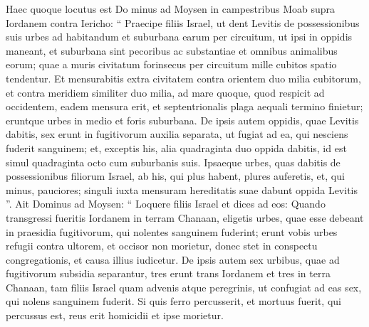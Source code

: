 \begin{biblechapter}
\begin{biblechapter}
\begin{biblechapter}
\begin{biblechapter}
\begin{biblechapter}
\begin{biblechapter}
\begin{biblechapter}
\begin{biblechapter}
\begin{biblechapter}
\begin{biblechapter}
\begin{biblechapter}
\begin{biblechapter}
\begin{biblechapter}
\begin{biblechapter}
\begin{biblechapter}
\begin{biblechapter}
\begin{biblechapter}
\begin{biblechapter}
\begin{biblechapter}
\begin{biblechapter}
\begin{biblechapter}
\begin{biblechapter}
\begin{biblechapter}
\begin{biblechapter}
\begin{biblechapter}
\begin{biblechapter}
\begin{biblechapter}
\begin{biblechapter}
\begin{biblechapter}
\begin{biblechapter}
\begin{biblechapter}
\begin{biblechapter}
\begin{biblechapter}
\begin{biblechapter}
\begin{biblechapter}
\verse Haec quoque locutus est Do minus ad Moysen in campestribus Moab supra Iordanem contra Iericho: 
\verse “ Praecipe filiis Israel, ut dent Levitis de possessionibus suis urbes ad habitandum et suburbana earum per circuitum, 
\verse ut ipsi in oppidis maneant, et suburbana sint pecoribus ac substantiae et omnibus animalibus eorum; 
\verse quae a muris civitatum forinsecus per circuitum mille cubitos spatio tendentur. 
\verse Et mensurabitis extra civitatem contra orientem duo milia cubitorum, et contra meridiem similiter duo milia, ad mare quoque, quod respicit ad occidentem, eadem mensura erit, et septentrionalis plaga aequali termino finietur; eruntque urbes in medio et foris suburbana.
 \verse De ipsis autem oppidis, quae Levitis dabitis, sex erunt in fugitivorum auxilia separata, ut fugiat ad ea, qui nesciens fuderit sanguinem; et, exceptis his, alia quadraginta duo oppida dabitis, 
\verse id est simul quadraginta octo cum suburbanis suis. 
\verse Ipsaeque urbes, quas dabitis de possessionibus filiorum Israel, ab his, qui plus habent, plures auferetis, et, qui minus, pauciores; singuli iuxta mensuram hereditatis suae dabunt oppida Levitis ”.
 \verse Ait Dominus ad Moysen: 
\verse “ Loquere filiis Israel et dices ad eos: Quando transgressi fueritis Iordanem in terram Chanaan, 
\verse eligetis urbes, quae esse debeant in praesidia fugitivorum, qui nolentes sanguinem fuderint; 
\verse erunt vobis urbes refugii contra ultorem, et occisor non morietur, donec stet in conspectu congregationis, et causa illius iudicetur. 
\verse De ipsis autem sex urbibus, quae ad fugitivorum subsidia separantur, 
\verse tres erunt trans Iordanem et tres in terra Chanaan, 
\verse tam filiis Israel quam advenis atque peregrinis, ut confugiat ad eas sex, qui nolens sanguinem fuderit.
 \verse Si quis ferro percusserit, et mortuus fuerit, qui percussus est, reus erit homicidii et ipse morietur. 

\end{biblechapter}
\end{biblechapter}
\end{biblechapter}
\end{biblechapter}
\end{biblechapter}
\end{biblechapter}
\end{biblechapter}
\end{biblechapter}
\end{biblechapter}
\end{biblechapter}
\end{biblechapter}
\end{biblechapter}
\end{biblechapter}
\end{biblechapter}
\end{biblechapter}
\end{biblechapter}
\end{biblechapter}
\end{biblechapter}
\end{biblechapter}
\end{biblechapter}
\end{biblechapter}
\end{biblechapter}
\end{biblechapter}
\end{biblechapter}
\end{biblechapter}
\end{biblechapter}
\end{biblechapter}
\end{biblechapter}
\end{biblechapter}
\end{biblechapter}
\end{biblechapter}
\end{biblechapter}
\end{biblechapter}
\end{biblechapter}
\end{biblechapter}
